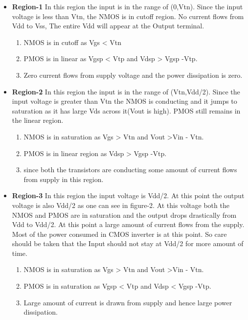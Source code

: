 \documentclass[12pt]{article}
\begin{document}
\begin{itemize}

\item \textbf{Region-1}
In this region the input is in the range of (0,Vtn). Since the input voltage is less than Vtn, the NMOS is in cutoff region. No current flows from Vdd to Vss, The entire Vdd will appear at the Output terminal. 
\begin{enumerate}
    \item NMOS is in cutoff as Vgs < Vtn
\item PMOS is in linear as Vgsp < Vtp and Vdsp > Vgsp -Vtp.
\item Zero current flows from supply voltage and the power dissipation is zero.
\end{enumerate}

\item \textbf{Region-2}
In this region the input is in the range of (Vtn,Vdd/2). Since the input voltage is greater than Vtn the NMOS is conducting and it jumps to saturation as it has large Vds across it(Vout is high). PMOS still remains in the linear region.
\begin{enumerate}
    \item NMOS is in saturation as Vgs > Vtn and Vout >Vin - Vtn.
\item PMOS is in linear region as Vdsp > Vgsp -Vtp.
\item since both the transistors are conducting some amount of current flows from supply in this region.
\end{enumerate}

\item \textbf{Region-3}
In this region the input voltage is Vdd/2. At this point the output voltage is also Vdd/2 as one can see in figure-2. At this voltage both the NMOS and PMOS are in saturation and the output drops drastically from Vdd to Vdd/2. At this point a large amount of current flows from the supply. Most of the power consumed in CMOS inverter is at this point. So care should be taken that the Input should not stay at Vdd/2 for more amount of time.
\begin{enumerate}
    \item NMOS is in saturation as Vgs > Vtn and Vout >Vin - Vtn.
    \item PMOS is in saturation as Vgsp < Vtp and Vdsp < Vgsp -Vtp.
    \item Large amount of current is drawn from supply and hence large power dissipation.
\end{enumerate}


\end{itemize}
\end{document}
